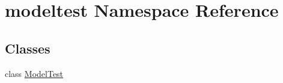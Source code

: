 \hypertarget{namespacemodeltest}{}\section{modeltest Namespace Reference}
\label{namespacemodeltest}
\subsection*{Classes}
\begin{DoxyCompactItemize}
\item 
class \hyperlink{classmodeltest_1_1ModelTest}{Model\+Test}
\end{DoxyCompactItemize}
